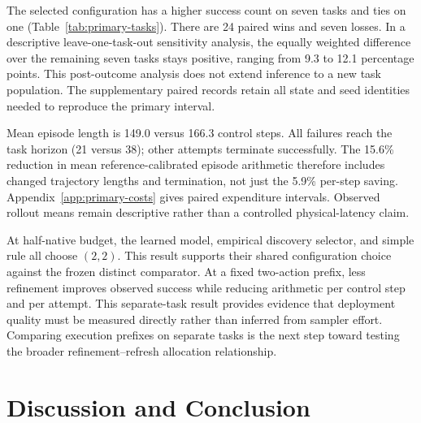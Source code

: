 \documentclass{article}
\begin{document}
\begin{table}[htbp]
\centering\small
\caption{Primary outcomes by task at $h=2$. Each condition has ten states and
two seeds per task. A win is a paired task--state--seed identity where only
$d=2$ succeeds; a loss is one where only $d=5$ succeeds. These joint counts
describe the observed pairs; uncertainty resamples states with both seeds
retained, not independent seed repeats.}
\label{tab:primary-tasks}

\end{table}

The selected configuration has a higher success count on seven tasks and ties
on one (Table~\ref{tab:primary-tasks}). There are 24 paired wins and seven
losses. In a descriptive leave-one-task-out sensitivity analysis, the
equally weighted difference over the remaining seven tasks stays positive,
ranging from 9.3 to 12.1 percentage points. This post-outcome analysis does not
extend inference to a new task population. The supplementary paired records
retain all state and seed identities needed to reproduce the primary interval.

Mean episode length is 149.0 versus 166.3 control steps. All failures reach
the task horizon (21 versus 38); other attempts terminate successfully.
The 15.6\% reduction in mean reference-calibrated episode arithmetic therefore
includes changed trajectory lengths and termination, not just the 5.9\%
per-step saving. Appendix~\ref{app:primary-costs} gives paired expenditure
intervals. Observed rollout means remain descriptive rather than a controlled
physical-latency claim.

At half-native budget, the learned model, empirical discovery selector, and
simple rule all choose $(2,2)$. This result supports their shared configuration
choice against the frozen distinct comparator. At a fixed two-action prefix,
less refinement improves observed success while reducing arithmetic per control
step and per attempt. This separate-task result provides evidence that
deployment quality must be measured directly rather than inferred from sampler
effort. Comparing execution prefixes on separate tasks is the next step toward
testing the broader refinement--refresh allocation relationship.

\section{Discussion and Conclusion}
\end{document}
